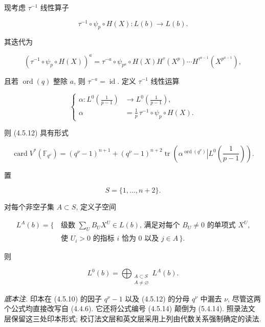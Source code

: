 现考虑 $\tau^{-1}$ 线性算子

\begin{equation}\tag{4.5.13}
\tau^{-1}\circ\psi_p\circ H(X):L(b)\longrightarrow L(b).
\end{equation}

其迭代为

\begin{equation}\tag{4.5.14}
(\tau^{-1}\circ\psi_p\circ H(X))^a
=\tau^{-a}\circ\psi_{p^a}\circ
H(X)H^\tau(X^p)\cdots H^{\tau^{a-1}}(X^{p^{a-1}}),
\end{equation}

且若 $\operatorname{ord}(q)$ 整除 $a$, 则 $\tau^{-a}=\operatorname{id}$.
定义 $\tau^{-1}$ 线性运算

\begin{equation}\tag{4.5.15}
\left\{
\begin{aligned}
\alpha:L^0\!\left(\frac1{p-1}\right)
&\longrightarrow L^0\!\left(\frac1{p-1}\right),\\
\alpha&=\frac1p\,\tau^{-1}\circ\psi_p\circ H(X).
\end{aligned}
\right.
\end{equation}

则 (4.5.12) 具有形式

\begin{equation}\tag{4.5.16}
\operatorname{card}V^*(\mathbb F_{q^\nu})
=(q^\nu-1)^{n+1}
+(q^\nu-1)^{n+2}
\operatorname{tr}\!\left(
\left.\alpha^{\operatorname{ord}(q^\nu)}
\right|L^0\!\left(\frac1{p-1}\right)\right).
\end{equation}

置

\begin{equation}\tag{4.5.17}
S=\{1,\ldots,n+2\}.
\end{equation}

对每个非空子集 $A\subset S$, 定义子空间

\begin{equation}\tag{4.5.18}
\begin{aligned}
L^A(b)=\{\,&\text{级数 $\sum_U B_UX^U\in L(b)$, 满足对每个 $B_U\ne0$ 的单项式 $X^U$,}\\
&\text{使 $U_i>0$ 的指标 $i$ 恰为 $0$ 以及 $j\in A$}\,\}.
\end{aligned}
\end{equation}

则

\begin{equation}\tag{4.5.19}
L^0(b)=\bigoplus_{\substack{A\subset S\\A\ne\varnothing}}L^A(b).
\end{equation}

\medskip
\noindent\emph{底本注.}
印本在 (4.5.10) 的因子 $q^\nu-1$ 以及 (4.5.12) 的分母 $q^\nu$ 中漏去 $\nu$,
尽管这两个公式均直接改写自 (4.4.6). 它还将公式编号 (4.5.14) 颠倒为 (5.4.14).
照录法文层保留这三处印本形式; 校订法文层和英文层采用上列由代数关系强制确定的读法.
